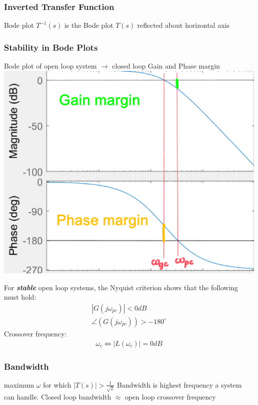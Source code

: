     \subsubsection{Inverted Transfer Function}
        Bode plot $T^{-1}(s)$ is the Bode plot $T(s)$ reflected about horizontal axis

    \subsubsection{Stability in Bode Plots}
        \begin{minipage}{0.64 \linewidth}
                Bode plot of open loop system $\rightarrow$ closed loop Gain and Phase margin
                \includegraphics[width = \linewidth]{src/images/gain_phase_margin.png}
        \end{minipage}
        \begin{minipage}{0.34 \linewidth}
            For \textbf{\textit{stable}} open loop systems, the Nyquist criterion shows that the following must hold:
            \begin{align*}
                |G(j \omega_{pc})| < 0 dB\\
                \angle(G(j \omega_{pc})) > -180^{\circ}
            \end{align*}
            Crossover frequency:
            \begin{align*}
                \omega_{c} \Leftrightarrow |L(\omega_c)| = 0dB
            \end{align*}
        \end{minipage}

    

    \subsubsection{Bandwidth}
        maximum $\omega$ for which $|T(s)| > \frac{1}{\sqrt{2}}$
        Bandwidth is highest frequency a system can handle. Closed loop bandwidth $\approx$ open loop crossover frequency
        